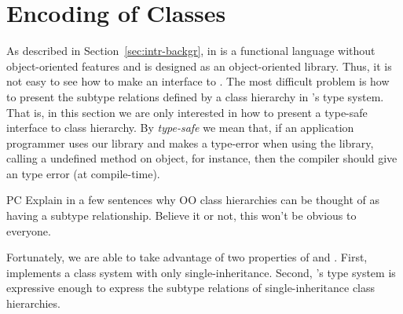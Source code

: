\documentclass[workingdraft]{usetex-v1}
\begin{document}

\section{Encoding of Classes}
\label{sec:encoding-classes}

As described in Section~\ref{sec:intr-backgr}, \sml in is a functional
language without object-oriented features and \gtk is designed as an
object-oriented library.  Thus, it is not easy to see how to make an \sml
interface to \gtk.  The most difficult problem is how to present the
subtype relations defined by a class hierarchy in \sml's type system.
That is, in this section we are only interested in how to present a
type-safe \sml interface to \gtk class hierarchy.  By \emph{type-safe} we
mean that, if an \sml application programmer uses our library and
makes a type-error when using the \gtk library, calling a undefined
method on object, for instance, then the \sml compiler should give an
type error (at compile-time).


\begin{ednote}{PC}
  Explain in a few sentences why OO class hierarchies can be
  thought of as having a subtype relationship.  Believe it or
  not, this won't be obvious to everyone.
\end{ednote}

Fortunately, we are able to take advantage of two properties of \gtk
and \sml.  First, \gtk implements a class system with only
single-inheritance.  Second, \sml's type system is expressive enough
to express the subtype relations of single-inheritance class
hierarchies.  
\end{document}
